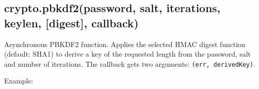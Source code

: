 \begin{Shaded}
\begin{Highlighting}[]
 \NormalTok{(}\NormalTok{);}
 \NormalTok{(}\NormalTok{);}
 \NormalTok{(}\NormalTok{);}

\NormalTok{();}
\NormalTok{();}

 \NormalTok{(}\NormalTok{(), }\NormalTok{, }\NormalTok{);}
 \NormalTok{(}\NormalTok{(), }\NormalTok{, }\NormalTok{);}

\end{Highlighting}
\end{Shaded}

\subsection{crypto.pbkdf2(password, salt, iterations, keylen,
{[}digest{]},
callback)}\label{crypto.pbkdf2password-salt-iterations-keylen-digest-callback}

Asynchronous PBKDF2 function. Applies the selected HMAC digest function
(default: SHA1) to derive a key of the requested length from the
password, salt and number of iterations. The callback gets two
arguments: \texttt{(err, derivedKey)}.

Example:

\begin{Shaded}
\begin{Highlighting}[]
\NormalTok{(}\NormalTok{, }\NormalTok{, }\NormalTok{, }\NormalTok{, }\NormalTok{, }
   
     
  \NormalTok{(}\NormalTok{(}\NormalTok{));  }
\NormalTok{\});}
\end{Highlighting}
\end{Shaded}

